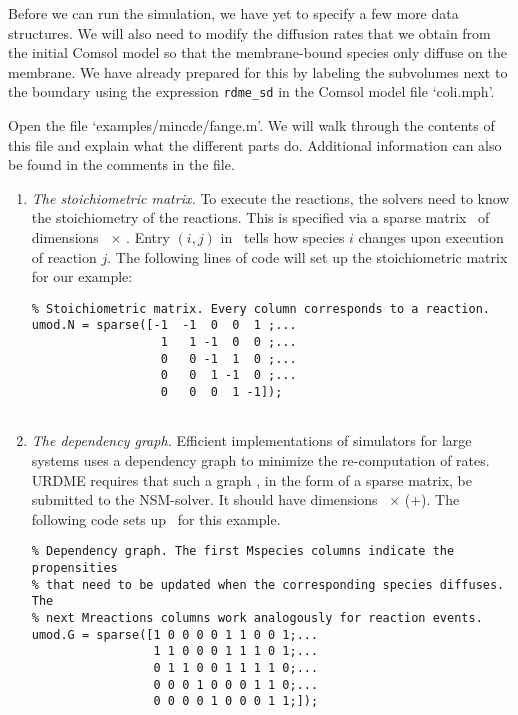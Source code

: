 Before we can run the simulation, we have yet to specify a few more
data structures. We will also need to modify the diffusion rates that
we obtain from the initial Comsol model so that the membrane-bound
species only diffuse on the membrane. We have already prepared for
this by labeling the subvolumes next to the boundary using the
expression \texttt{rdme\_sd} in the Comsol model file `coli.mph'.

Open the file `examples/mincde/fange.m'. We will walk through the
contents of this file and explain what the different parts
do. Additional information can also be found in the comments in the
file.

\begin{enumerate}

\item \emph{The stoichiometric matrix.} To execute the reactions, the
  solvers need to know the stoichiometry of the reactions. This is
  specified via a sparse matrix \varN\ of dimensions
  \varMspecies\ $\times$ \varMreactions. Entry $(i,j)$ in \varN\ tells
  how species $i$ changes upon execution of reaction $j$. The
  following lines of code will set up the stoichiometric matrix for
  our example:

\begin{verbatim}
% Stoichiometric matrix. Every column corresponds to a reaction.
umod.N = sparse([-1  -1  0  0  1 ;...
                  1   1 -1  0  0 ;...
                  0   0 -1  1  0 ;...
                  0   0  1 -1  0 ;...
                  0   0  0  1 -1]);
                
\end{verbatim} 

\item \emph{The dependency graph.} Efficient implementations of
  simulators for large systems uses a dependency graph to minimize the
  re-computation of rates. URDME requires that such a graph \varG, in
  the form of a sparse matrix, be submitted to the NSM-solver. It
  should have dimensions \varMreactions\ $\times$
  (\varMspecies+\varMreactions). The following code sets up \varG\ for
  this example.

\begin{verbatim}
% Dependency graph. The first Mspecies columns indicate the propensities
% that need to be updated when the corresponding species diffuses. The 
% next Mreactions columns work analogously for reaction events.
umod.G = sparse([1 0 0 0 0 1 1 0 0 1;...
                 1 1 0 0 0 1 1 1 0 1;...
                 0 1 1 0 0 1 1 1 1 0;...
                 0 0 0 1 0 0 0 1 1 0;...
                 0 0 0 0 1 0 0 0 1 1;]);
\end{verbatim}


\end{enumerate}
